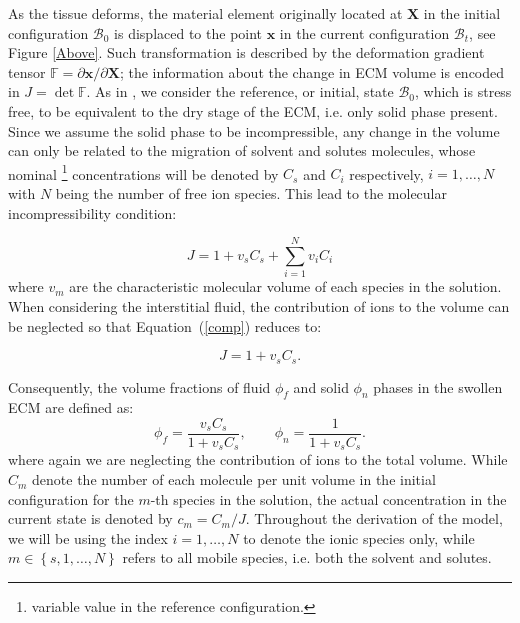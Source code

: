 \documentclass[runningheads]{llncs}
\newcommand{\F}{\ensuremath{\mathbb{F}}}
\begin{document}
As the tissue deforms, the material element originally located at $\mathbf{X}$ in the initial configuration $\mathcal{B}_0$ is displaced to the point $\mathbf{x}$ in the current configuration $\mathcal{B}_t$, see Figure \ref{Above}. Such transformation is described by the deformation gradient tensor $\F= \partial \mathbf{x}/\partial \mathbf{X}$; the information about the change in ECM volume is encoded in $J= \det \F$. As in \cite{sarah}, we consider the reference, or initial, state $\mathcal{B}_0$, which is stress free, to be equivalent to the dry stage of the ECM, i.e. only solid phase present. Since we assume the solid phase to be incompressible, any change in the volume can only be related to the migration of solvent and solutes molecules, whose nominal \footnote{variable value in the reference configuration.} concentrations will be denoted by $C_s$ and $C_i$ respectively, $i=1,\ldots,N$ with $N$ being the number of free ion species. This lead to the molecular incompressibility condition:

\begin{equation}
 J= 1 + v_s C_s +\sum\limits_{i=1}^{N} v_i C_i
 \label{comp}
\end{equation}
where $v_m$ are the characteristic molecular volume of each species in the solution. When considering the interstitial fluid, the contribution of ions to the volume can be neglected \cite{ecm1,ecm2} so that Equation~(\ref{comp}) reduces to:

\begin{equation}
J=1+v_s C_s.
\label{inc}
\end{equation} 

Consequently, the volume fractions of fluid $\phi_f$ and solid $\phi_n$ phases in the swollen ECM are defined as:
\begin{equation}
\phi_f = \frac{v_sC_s}{1+v_sC_s}, \qquad \phi_n = \frac{1}{1+v_sC_s}.
\end{equation}
where again we are neglecting the contribution of ions to the total volume.
While $C_m$ denote the number of each molecule per unit volume in the initial configuration for the $m$-th species in the solution, the actual concentration in the current state is denoted by $c_m=C_m/J$. Throughout the derivation of the model, we will be using the index $i=1,\ldots,N$ to denote the ionic species only, while $m\in\left\{s,1,\ldots,N\right\}$ refers to all mobile species, i.e. both the solvent and solutes.
\end{document}
